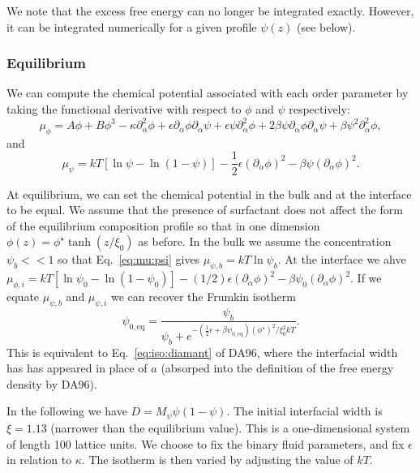 We note that the excess free energy can no longer be integrated
exactly. However, it can be integrated numerically for a
given profile $\psi(z)$ (see below).

\subsubsection{Equilibrium}

We can compute the chemical potential associated with each order
parameter by taking the functional derivative with respect to
$\phi$ and $\psi$ respectively:
\begin{equation}
\mu_\phi = A\phi + B\phi^3 - \kappa \partial_\alpha^2 \phi
+ \epsilon \partial_\alpha \phi \partial_\alpha \psi
+ \epsilon \psi \partial_\alpha^2 \phi
+ 2\beta\psi \partial_\alpha \phi \partial_\alpha \psi
+ \beta\psi^2 \partial_\alpha^2 \phi,
\label{eq:mu:phi}
\end{equation}
and
\begin{equation}
\mu_\psi = kT[\ln\psi - \ln(1 - \psi)]
- {\textstyle \frac{1}{2}} \epsilon (\partial_\alpha \phi)^2
- \beta\psi (\partial_\alpha \phi)^2.
\label{eq:mu:psi}
\end{equation}

At equilibrium, we can set the chemical potential in the bulk and
at the interface to be equal. We assume that the presence of
surfactant does not affect the form of the equilibrium
composition profile so that in one dimension
$\phi(z) = \phi^\star \tanh(z/\xi_0)$ as before.
In the bulk we assume the concentration $\psi_b << 1$ so that
Eq.~\ref{eq:mu:psi} gives $\mu_{\psi,b} = kT\ln \psi_b$. At
the interface we ahve $\mu_{\phi,i} = kT[\ln\psi_0 - \ln(1 - \psi_0)]
- (1/2)\epsilon(\partial_\alpha \phi)^2
- \beta\psi_0 (\partial_\alpha \phi)^2$.
If we equate $\mu_{\psi, b}$ and $\mu_{\psi,i}$ we can recover the
Frumkin isotherm
\begin{equation}
\psi_{0,\mathrm{eq}} = \frac{\psi_b}{\psi_b +
e^{-({\scriptscriptstyle \frac{1}{2}}\epsilon + \beta\psi_{0,\mathrm{eq}})
(\phi^\star)^2 / \xi_0^2 kT}}.
\end{equation}
This is equivalent to Eq.~\ref{eq:iso:diamant} of DA96, where the
interfacial width has has appeared in place of $a$ (absorped into
the definition of the free energy density by DA96).


In the following we have $D = M_\psi \psi ( 1 - \psi)$. The
initial interfacial width is $\xi = 1.13$ (narrower than the
equilibrium value). This is a one-dimensional system of
length 100 lattice units. We choose to fix the binary fluid
parameters, and fix $\epsilon$ in relation to $\kappa$. The
isotherm is then varied by adjusting the value of $kT$.

